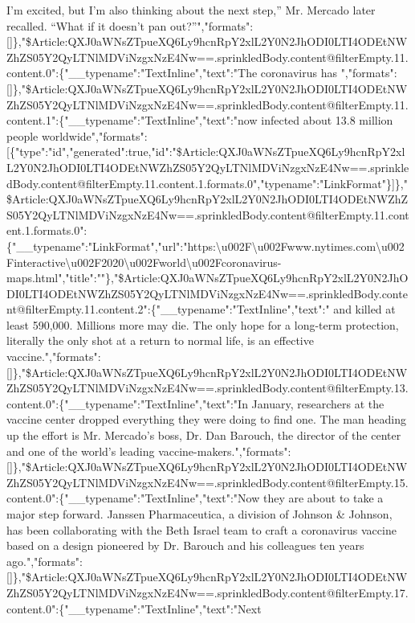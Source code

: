 I'm excited, but I'm also thinking about the next step,'' Mr. Mercado
later recalled. ``What if it doesn't pan
out?''","formats":{[}{]}\},"\$Article:QXJ0aWNsZTpueXQ6Ly9hcnRpY2xlL2Y0N2JhODI0LTI4ODEtNWZhZS05Y2QyLTNlMDViNzgxNzE4Nw==.sprinkledBody.content@filterEmpty.11.content.0":\{"\_\_typename":"TextInline","text":"The
coronavirus has
","formats":{[}{]}\},"\$Article:QXJ0aWNsZTpueXQ6Ly9hcnRpY2xlL2Y0N2JhODI0LTI4ODEtNWZhZS05Y2QyLTNlMDViNzgxNzE4Nw==.sprinkledBody.content@filterEmpty.11.content.1":\{"\_\_typename":"TextInline","text":"now
infected about 13.8 million people
worldwide","formats":{[}\{"type":"id","generated":true,"id":"\$Article:QXJ0aWNsZTpueXQ6Ly9hcnRpY2xlL2Y0N2JhODI0LTI4ODEtNWZhZS05Y2QyLTNlMDViNzgxNzE4Nw==.sprinkledBody.content@filterEmpty.11.content.1.formats.0","typename":"LinkFormat"\}{]}\},"\$Article:QXJ0aWNsZTpueXQ6Ly9hcnRpY2xlL2Y0N2JhODI0LTI4ODEtNWZhZS05Y2QyLTNlMDViNzgxNzE4Nw==.sprinkledBody.content@filterEmpty.11.content.1.formats.0":\{"\_\_typename":"LinkFormat","url":"https:\textbackslash{}u002F\textbackslash{}u002Fwww.nytimes.com\textbackslash{}u002Finteractive\textbackslash{}u002F2020\textbackslash{}u002Fworld\textbackslash{}u002Fcoronavirus-maps.html","title":""\},"\$Article:QXJ0aWNsZTpueXQ6Ly9hcnRpY2xlL2Y0N2JhODI0LTI4ODEtNWZhZS05Y2QyLTNlMDViNzgxNzE4Nw==.sprinkledBody.content@filterEmpty.11.content.2":\{"\_\_typename":"TextInline","text":"
and killed at least 590,000. Millions more may die. The only hope for a
long-term protection, literally the only shot at a return to normal
life, is an effective
vaccine.","formats":{[}{]}\},"\$Article:QXJ0aWNsZTpueXQ6Ly9hcnRpY2xlL2Y0N2JhODI0LTI4ODEtNWZhZS05Y2QyLTNlMDViNzgxNzE4Nw==.sprinkledBody.content@filterEmpty.13.content.0":\{"\_\_typename":"TextInline","text":"In
January, researchers at the vaccine center dropped everything they were
doing to find one. The man heading up the effort is Mr. Mercado's boss,
Dr. Dan Barouch, the director of the center and one of the world's
leading
vaccine-makers.","formats":{[}{]}\},"\$Article:QXJ0aWNsZTpueXQ6Ly9hcnRpY2xlL2Y0N2JhODI0LTI4ODEtNWZhZS05Y2QyLTNlMDViNzgxNzE4Nw==.sprinkledBody.content@filterEmpty.15.content.0":\{"\_\_typename":"TextInline","text":"Now
they are about to take a major step forward. Janssen Pharmaceutica, a
division of Johnson \& Johnson, has been collaborating with the Beth
Israel team to craft a coronavirus vaccine based on a design pioneered
by Dr. Barouch and his colleagues ten years
ago.","formats":{[}{]}\},"\$Article:QXJ0aWNsZTpueXQ6Ly9hcnRpY2xlL2Y0N2JhODI0LTI4ODEtNWZhZS05Y2QyLTNlMDViNzgxNzE4Nw==.sprinkledBody.content@filterEmpty.17.content.0":\{"\_\_typename":"TextInline","text":"Next
